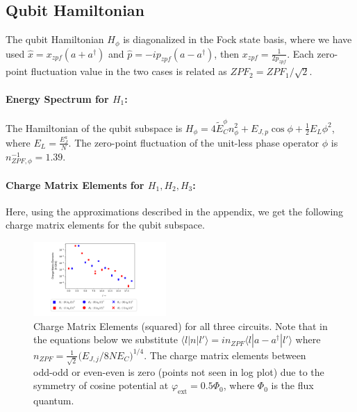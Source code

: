 \documentclass[%
reprint,
superscriptaddress,
 amsmath,amssymb,
 aps,
 prx,
longbibliography,
floatfix,
]{revtex4-2}
\begin{document}
\subsection{Qubit Hamiltonian}\label{app:coupling}
The qubit Hamiltonian $H_{\phi}$ is diagonalized in the Fock state basis, where we have used $\hat x=x_{zpf}(a+a^\dagger)$ and $\hat p=-ip_{zpf}(a-a^\dagger)$, then $x_{zpf}=\frac{1}{2p_{zpf}}$. Each zero-point fluctuation value in the two cases is related as $ZPF_2=ZPF_1/\sqrt{2}$. \paragraph{Energy Spectrum for $H_1$:}
The Hamiltonian of the qubit subspace is $H_\phi=4\tilde{E}_C^\phi n_\phi^2+E_{J,p}\cos{\phi}+\frac{1}{2}E_L\phi^2$, where $E_L=\frac{E_J^a}{N}$. The zero-point fluctuation of the unit-less phase operator $\phi$ is $n_{ZPF,\phi}^{-1}=1.39$. 
\paragraph{Charge Matrix Elements for $H_1,H_2,H_3$:}
Here, using the approximations described in the appendix, we get the following charge matrix elements for the qubit subspace.
\begin{figure}[tbh]
    \centering
\includegraphics[width=0.45\textwidth]{Figures/Charge_Matrix.pdf}
    \caption{Charge Matrix Elements (squared) for all three circuits. Note that in the equations below we substitute $\langle l|n|l'\rangle=in_{ZPF}\langle l|a-a^\dagger|l'\rangle$ where $n_{ZPF}=\frac{1}{\sqrt{2}}\Big(E_{J,j}/8NE_C\Big)^{1/4}$. The charge matrix elements between odd-odd or even-even is zero (points not seen in log plot) due to the symmetry of cosine potential at $\varphi_\mathrm{ext}=0.5\Phi_0$, where $\Phi_0$ is the flux quantum.}
    \label{charge-matrix}
\end{figure}
\end{document}
